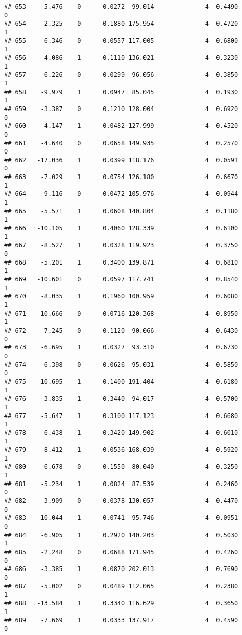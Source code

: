 \documentclass[
]{article}
\begin{document}
\begin{verbatim}
## 653    -5.476    0      0.0272  99.014              4  0.4490      0
## 654    -2.325    0      0.1880 175.954              4  0.4720      1
## 655    -6.346    0      0.0557 117.005              4  0.6800      1
## 656    -4.086    1      0.1110 136.021              4  0.3230      1
## 657    -6.226    0      0.0299  96.056              4  0.3850      1
## 658    -9.979    1      0.0947  85.045              4  0.1930      1
## 659    -3.387    0      0.1210 128.004              4  0.6920      0
## 660    -4.147    1      0.0482 127.999              4  0.4520      0
## 661    -4.640    0      0.0658 149.935              4  0.2570      0
## 662   -17.036    1      0.0399 118.176              4  0.0591      0
## 663    -7.029    1      0.0754 126.180              4  0.6670      1
## 664    -9.116    0      0.0472 105.976              4  0.0944      1
## 665    -5.571    1      0.0608 140.804              3  0.1180      1
## 666   -10.105    1      0.4060 128.339              4  0.6100      1
## 667    -8.527    1      0.0328 119.923              4  0.3750      0
## 668    -5.201    1      0.3400 139.871              4  0.6810      1
## 669   -10.601    0      0.0597 117.741              4  0.8540      1
## 670    -8.035    1      0.1960 100.959              4  0.6080      1
## 671   -10.666    0      0.0716 120.368              4  0.8950      1
## 672    -7.245    0      0.1120  90.066              4  0.6430      0
## 673    -6.695    1      0.0327  93.310              4  0.6730      0
## 674    -6.398    0      0.0626  95.031              4  0.5850      0
## 675   -10.695    1      0.1400 191.404              4  0.6180      1
## 676    -3.835    1      0.3440  94.017              4  0.5700      1
## 677    -5.647    1      0.3100 117.123              4  0.6680      1
## 678    -6.438    1      0.3420 149.902              4  0.6010      1
## 679    -8.412    1      0.0536 168.039              4  0.5920      1
## 680    -6.678    0      0.1550  80.040              4  0.3250      1
## 681    -5.234    1      0.0824  87.539              4  0.2460      0
## 682    -3.909    0      0.0378 130.057              4  0.4470      0
## 683   -10.044    1      0.0741  95.746              4  0.0951      0
## 684    -6.905    1      0.2920 140.203              4  0.5030      1
## 685    -2.248    0      0.0688 171.945              4  0.4260      0
## 686    -3.385    1      0.0870 202.013              4  0.7690      0
## 687    -5.002    0      0.0489 112.065              4  0.2380      1
## 688   -13.584    1      0.3340 116.629              4  0.3650      1
## 689    -7.669    1      0.0333 137.917              4  0.4590      0

\end{verbatim}
\end{document}
